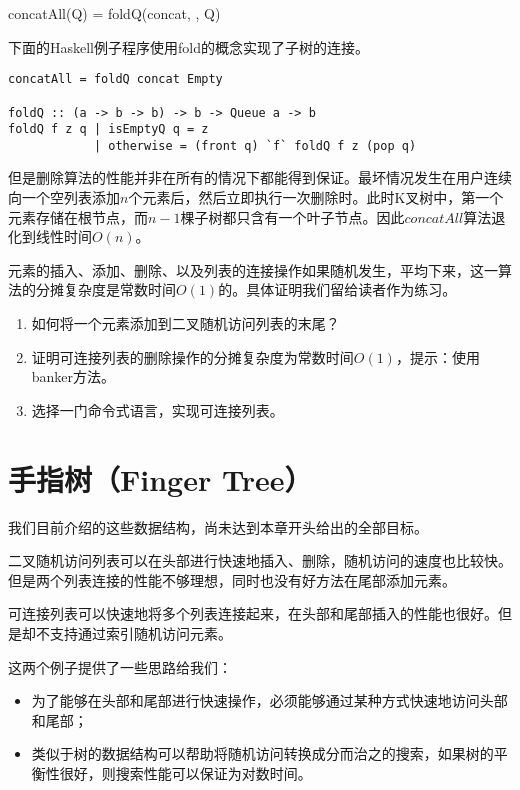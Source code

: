 \documentclass[UTF8]{article}
\begin{document}
\be
concatAll(Q) = foldQ(concat, \phi, Q)
\ee

下面的Haskell例子程序使用fold的概念实现了子树的连接。

\begin{lstlisting}[style=Haskell]
concatAll = foldQ concat Empty

foldQ :: (a -> b -> b) -> b -> Queue a -> b
foldQ f z q | isEmptyQ q = z
            | otherwise = (front q) `f` foldQ f z (pop q)
\end{lstlisting}

但是删除算法的性能并非在所有的情况下都能得到保证。最坏情况发生在用户连续向一个空列表添加$n$个元素后，然后立即执行一次删除时。此时K叉树中，第一个元素存储在根节点，而$n-1$棵子树都只含有一个叶子节点。因此$concatAll$算法退化到线性时间$O(n)$。

元素的插入、添加、删除、以及列表的连接操作如果随机发生，平均下来，这一算法的分摊复杂度是常数时间$O(1)$的。具体证明我们留给读者作为练习。

\begin{Exercise}
\begin{enumerate}
\item 如何将一个元素添加到二叉随机访问列表的末尾？

\item 证明可连接列表的删除操作的分摊复杂度为常数时间$O(1)$，提示：使用banker方法。

\item 选择一门命令式语言，实现可连接列表。
\end{enumerate}
\end{Exercise}

\section{手指树（Finger Tree）}
我们目前介绍的这些数据结构，尚未达到本章开头给出的全部目标。

二叉随机访问列表可以在头部进行快速地插入、删除，随机访问的速度也比较快。但是两个列表连接的性能不够理想，同时也没有好方法在尾部添加元素。

可连接列表可以快速地将多个列表连接起来，在头部和尾部插入的性能也很好。但是却不支持通过索引随机访问元素。

这两个例子提供了一些思路给我们：

\begin{itemize}
\item 为了能够在头部和尾部进行快速操作，必须能够通过某种方式快速地访问头部和尾部；
\item 类似于树的数据结构可以帮助将随机访问转换成分而治之的搜索，如果树的平衡性很好，则搜索性能可以保证为对数时间。
\end{itemize}
\end{document}
